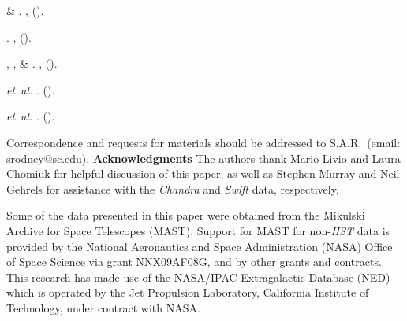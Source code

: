 \documentclass{article}
\def\Chandra{{\it Chandra}\xspace}
\def\Swift{{\it Swift}\xspace}
\begin{document}
\begin{thebibliography}{10}
 \& 
\newblock {}.
\newblock \emph{} \textbf{},
   ().

\newblock {}.
\newblock \emph{} \textbf{},
   ().

, ,
   \& 
\newblock {}.
\newblock \emph{} \textbf{},
   ().

 \emph{et~al.}
\newblock {}.
\newblock \emph{}  ().

 \emph{et~al.}
\newblock {}.
\newblock \emph{}  ().

\end{thebibliography}



\clearpage
\medskip
Correspondence and requests for materials
should be addressed to S.A.R.~(email: srodney@sc.edu).
\medskip
{\bf Acknowledgments}
The authors thank Mario Livio and Laura Chomiuk for helpful discussion
of this paper, as well as Stephen Murray and Neil Gehrels for
assistance with the \Chandra and \Swift data, respectively.

Some of the data presented in this paper were obtained from the
Mikulski Archive for Space Telescopes (MAST). Support for MAST 
for non-{\it HST} data is provided by the
National Aeronautics and Space Administration (NASA)
Office of Space Science via grant NNX09AF08G, and
by other grants and contracts.
This research has made use of the NASA/IPAC Extragalactic Database
(NED) which is operated by the Jet Propulsion Laboratory, California
Institute of Technology, under contract with NASA.
\end{document}
